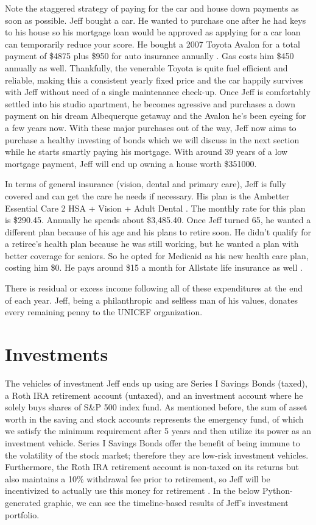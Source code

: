 \documentclass[12pt]{article}
\begin{document}
Note the staggered strategy of paying for the car and house down payments as soon as possible. 
Jeff bought a car. He wanted to purchase one after he had keys to his house so his mortgage loan would be approved as applying for a car loan can temporarily reduce your score. 
He bought a 2007 Toyota Avalon for a total payment of \$4875 plus \$950 for auto insurance annually \cite{car}. Gas costs him \$450 annually as well.
Thankfully, the venerable Toyota is quite fuel efficient and reliable, making this a consistent yearly fixed price and the car happily survives with Jeff without need of a single maintenance check-up.
Once Jeff is comfortably settled into his studio apartment, he becomes agressive and purchases a down payment on his dream Albequerque getaway and the Avalon he's been eyeing for a few years now.
With these major purchases out of the way, Jeff now aims to purchase a healthy investing of bonds which we will discuss in the next section while he starts smartly paying his mortgage.
With around 39 years of a low mortgage payment, Jeff will end up owning a house worth \$351000.

In terms of general insurance (vision, dental and primary care), Jeff is fully covered and can get the care he needs if necessary. His plan is the Ambetter Essential Care 2 HSA + Vision + Adult Dental \cite{insurance}. The monthly rate for this plan is \$290.45. 
Annually he spends about \$3,485.40. Once Jeff turned 65, he wanted a different plan because of his age and his plans to retire soon. He didn't qualify for a retiree's health plan because he was still working, but he wanted a plan with better coverage for seniors. So he opted for Medicaid as his new health care plan, costing him \$0.
He pays around \$15 a month for Allstate life insurance as well \cite{lifeinsurance}.

There is residual or excess income following all of these expenditures at the end of each year. Jeff, being a philanthropic and selfless man of his values, donates every remaining penny to the UNICEF organization.

\section{Investments}

The vehicles of investment Jeff ends up using are Series I Savings Bonds (taxed), a Roth IRA retirement account (untaxed), and an investment account where he solely buys shares of S\&P 500 index fund.
As mentioned before, the sum of asset worth in the saving and stock accounts represents the emergency fund, of which we satisfy the minimum requirement after 5 years and then utilize its power as an investment vehicle.
Series I Savings Bonds offer the benefit of being immune to the volatility of the stock market; therefore they are low-risk investment vehicles. Furthermore, the Roth IRA retirement account is non-taxed on its returns
but also maintains a 10\% withdrawal fee prior to retirement, so Jeff will be incentivized to actually use this money for retirement \cite{RothIra}.
In the below Python-generated graphic, we can see the timeline-based results of Jeff's investment portfolio.
\end{document}
